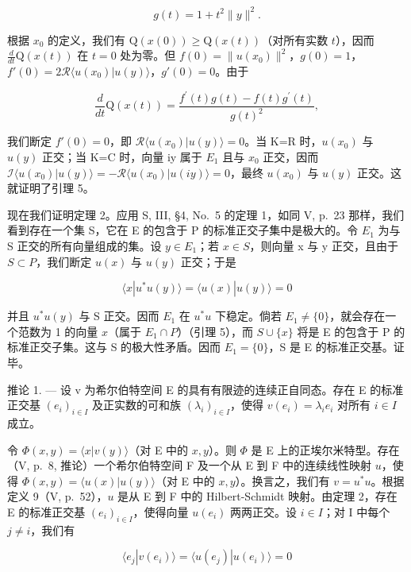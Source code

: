 \[
g (t) = 1 + t ^ {2} \| y \| ^ {2}.
\]

根据 \(x_0\) 的定义，我们有 \(\mathrm{Q}(x(0)) \geqslant \mathrm{Q}(x(t))\)（对所有实数 \(t\)），因而 \(\frac{d}{dt} \mathrm{Q}(x(t))\) 在 \(t = 0\) 处为零。但 \(f(0) = \| u(x_0)\|^2\)，\(g(0) = 1\)，\(f'(0) = 2\mathcal{R}\langle u(x_0)|u(y)\rangle\)，\(g'(0) = 0\)。由于

\[
\frac {d}{d t} \mathrm{Q} (x (t)) = \frac {f ^ {\prime} (t) g (t) - f (t) g ^ {\prime} (t)}{g (t) ^ {2}},
\]

我们断定 \(f'(0)=0\)，即 \(\mathcal{R}\langle u(x_{0})|u(y)\rangle=0\)。当 K=R 时，\(u(x_{0})\) 与 \(u(y)\) 正交；当 K=C 时，向量 iy 属于 \(E_{1}\) 且与 \(x_{0}\) 正交，因而 \(\mathcal{I}\langle u(x_{0})|u(y)\rangle=-\mathcal{R}\langle u(x_{0})|u(iy)\rangle=0\)，最终 \(u(x_{0})\) 与 \(u(y)\) 正交。这就证明了引理 5。

现在我们证明定理 2。应用 S, III, §4, No.~5 的定理 1，如同 V, p.~23 那样，我们看到存在一个集 S，它在 E 的包含于 P 的标准正交子集中是极大的。令 \(E_{1}\) 为与 S 正交的所有向量组成的集。设 \(y \in E_{1}\)；若 \(x \in S\)，则向量 x 与 y 正交，且由于 \(S \subset P\)，我们断定 \(u(x)\) 与 \(u(y)\) 正交；于是

\[
\langle x | u ^ {*} u (y) \rangle = \langle u (x) | u (y) \rangle = 0
\]

并且 \(u^{*}u(y)\) 与 S 正交。因而 \(E_{1}\) 在 \(u^{*}u\) 下稳定。倘若 \(E_{1} \neq \{0\}\)，就会存在一个范数为 1 的向量 \(x\)（属于 \(E_{1} \cap P\)）（引理 5），而 \(S \cup \{x\}\) 将是 E 的包含于 P 的标准正交子集。这与 S 的极大性矛盾。因而 \(E_{1} = \{0\}\)，S 是 E 的标准正交基。证毕。

推论 1. --- 设 v 为希尔伯特空间 E 的具有有限迹的连续正自同态。存在 E 的标准正交基 \((e_{i})_{i\in I}\) 及正实数的可和族 \((\lambda_{i})_{i\in I}\)，使得 \(v(e_{i}) = \lambda_{i}e_{i}\) 对所有 \(i \in I\) 成立。

令 \(\Phi(x, y) = \langle x | v(y) \rangle\)（对 E 中的 \(x, y\)）。则 \(\Phi\) 是 E 上的正埃尔米特型。存在（V, p.~8, 推论）一个希尔伯特空间 F 及一个从 E 到 F 中的连续线性映射 \(u\)，使得 \(\Phi(x, y) = \langle u(x) | u(y) \rangle\)（对 E 中的 \(x, y\)）。换言之，我们有 \(v = u^{*}u\)。根据定义 9（V, p.~52），\(u\) 是从 E 到 F 中的 Hilbert-Schmidt 映射。由定理 2，存在 E 的标准正交基 \((e_{i})_{i \in I}\)，使得向量 \(u(e_{i})\) 两两正交。设 \(i \in I\)；对 I 中每个 \(j \neq i\)，我们有

\[
\langle e _ {j} | v (e _ {i}) \rangle = \langle u (e _ {j}) | u (e _ {i}) \rangle = 0
\]

